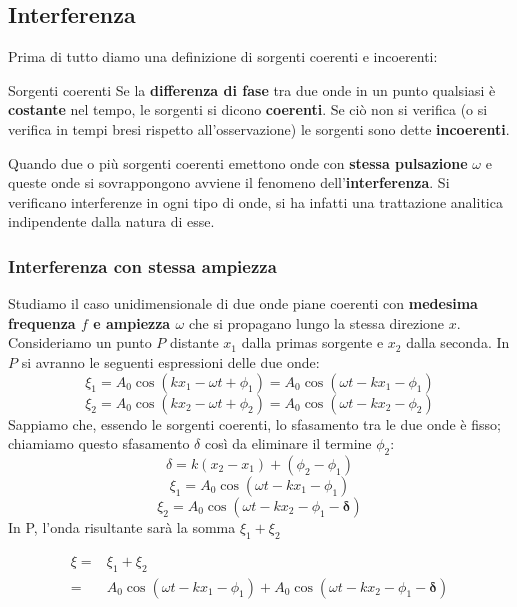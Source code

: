 \documentclass[x11names]{article}
\begin{document}
	
	\newpage
	\subsection{Interferenza}	
	Prima di tutto diamo una definizione di sorgenti coerenti e incoerenti:
	\begin{center}
		\colorbox{yblue}{\begin{minipage}{5.75in}
				\begin{blues}{Sorgenti coerenti}
					Se la \textbf{differenza di fase} tra due onde in un punto qualsiasi è \textbf{costante} nel tempo, le sorgenti si dicono \textbf{coerenti}. Se ciò non si verifica (o si verifica in tempi bresi rispetto all'osservazione) le sorgenti sono dette \textbf{incoerenti}.
				\end{blues}
		\end{minipage}}
	\end{center}
	Quando due o più sorgenti coerenti emettono onde con \textbf{stessa pulsazione} \(\omega\) e queste onde si sovrappongono avviene il fenomeno dell'\textbf{interferenza}. Si verificano interferenze in ogni tipo di onde, si ha infatti una trattazione analitica indipendente dalla natura di esse.
	
		\subsubsection{Interferenza con stessa ampiezza}
		Studiamo il caso unidimensionale di due onde piane coerenti con \textbf{medesima frequenza \(f\) e ampiezza \(\omega\)} che si propagano lungo la stessa direzione \(x\). Consideriamo un punto \(P\) distante \(x_1\) dalla primas sorgente e  \(x_2\) dalla seconda. In \(P\) si avranno le seguenti espressioni delle due onde:
		\[ 
		\xi_1 = A_0\cos\left(kx_1 -\omega t + \phi_1\right) = A_0\cos\left(\omega t - kx_1 - \phi_1\right)
		\]
		\[ 
		\xi_2 = A_0\cos\left(kx_2 -\omega t + \phi_2\right) = A_0\cos\left(\omega t - kx_2 - \phi_2\right)
		\]
		Sappiamo che, essendo le sorgenti coerenti, lo sfasamento tra le due onde è fisso; chiamiamo questo sfasamento \(\delta\) così da eliminare il termine \(\phi_2\):
		\[ 
		\boxed{\delta = k(x_2 - x_1) + (\phi_2-\phi_1)}
		\]
		\[ 
		\xi_1 = A_0\cos\left(\omega t - kx_1 - \phi_1\right)
		\]
		\[ 
		\xi_2 = A_0\cos\left(\omega t - kx_2 - \phi_1 - \boldsymbol{\delta}\right)
		\] 
		In P, l'onda risultante sarà la somma \(\xi _1 + \xi _2\)
		
		\begin{align*}
			\xi =& \xi_1 + \xi _2 \\
				=&  A_0\cos\left(\omega t - kx_1 - \phi_1\right) + A_0\cos\left(\omega t - kx_2 - \phi_1 - \boldsymbol{\delta}\right)
		\end{align*}
		
\end{document}
